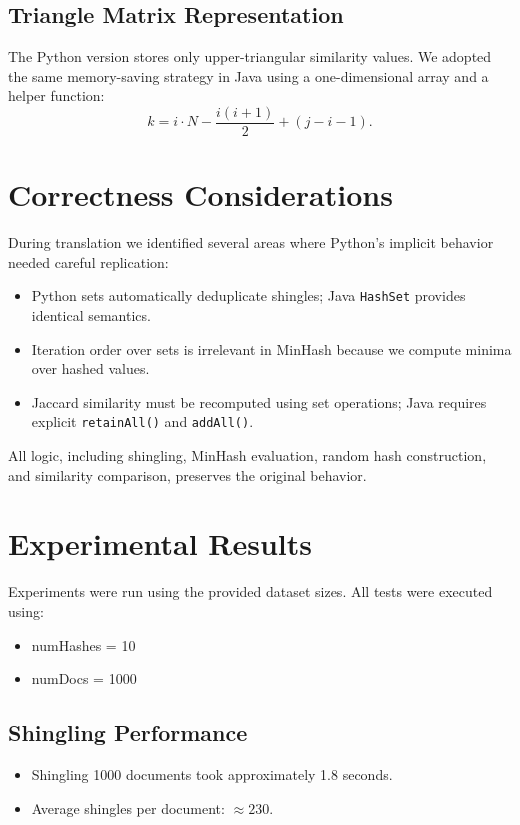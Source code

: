 \documentclass[11pt]{article}
\begin{document}
\subsection{Triangle Matrix Representation}
The Python version stores only upper-triangular similarity values. We adopted the same memory-saving strategy in Java using a one-dimensional array and a helper function:
\[
k = i \cdot N - \frac{i(i+1)}{2} + (j - i - 1).
\]

\section{Correctness Considerations}
During translation we identified several areas where Python’s implicit behavior needed careful replication:
\begin{itemize}
    \item Python sets automatically deduplicate shingles; Java \texttt{HashSet} provides identical semantics.
    \item Iteration order over sets is irrelevant in MinHash because we compute minima over hashed values.
    \item Jaccard similarity must be recomputed using set operations; Java requires explicit \texttt{retainAll()} and \texttt{addAll()}.
\end{itemize}
All logic, including shingling, MinHash evaluation, random hash construction, and similarity comparison, preserves the original behavior.

\section{Experimental Results}
Experiments were run using the provided dataset sizes. All tests were executed using:
\begin{itemize}
    \item numHashes = 10
    \item numDocs = 1000
\end{itemize}

\subsection{Shingling Performance}
\begin{itemize}
    \item Shingling 1000 documents took approximately 1.8 seconds.
    \item Average shingles per document: \(\approx 230\).
\end{itemize}
\end{document}

